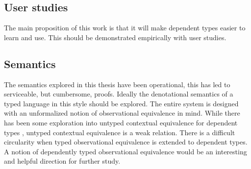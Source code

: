 \subsection{User studies}

The main proposition of this work is that it will make dependent types easier to learn and use.
This should be demonstrated empirically with user studies.

\subsection{Semantics}

The semantics explored in this thesis have been operational, this has led to serviceable, but cumbersome, proofs.
Ideally the denotational semantics of a typed language in this style should be explored.
The entire system is designed with an unformalized notion of observational equivalence in mind.
While there has been some exploration into untyped contextual equivalence for dependent types \cite{sjoberg2015dependently,jia2010dependent}, untyped contextual equivalence is a weak relation.
There is a difficult circularity when typed observational equivalence is extended to dependent types.
A notion of dependently typed observational equivalence would be an interesting and helpful direction for further study.
